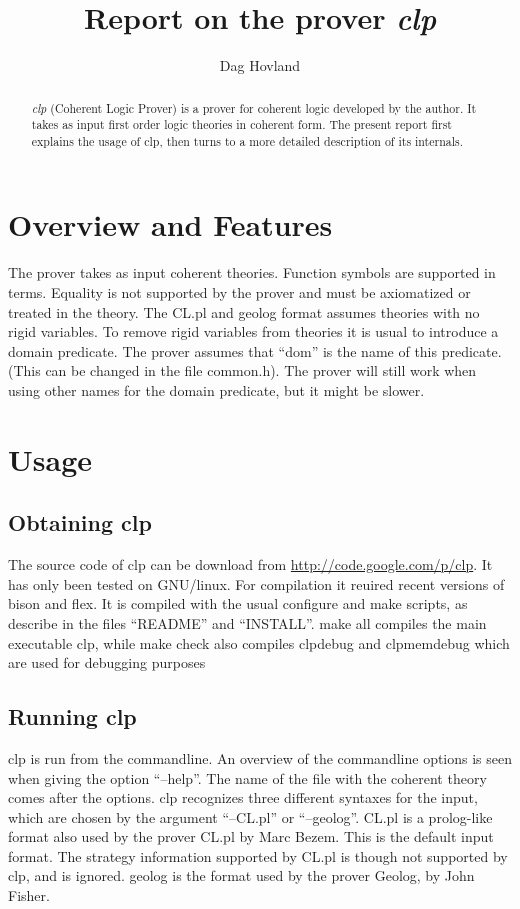 \documentclass[a4paper]{article}
\author{Dag Hovland}
\title{Report on the prover \emph{clp}}
\begin{document}
\maketitle
\begin{abstract}
  \emph{clp} (Coherent Logic Prover) is a prover for coherent logic developed by the author. It takes as input first order logic theories in coherent form. The present report first explains the usage of clp, then turns to a more detailed description of its internals.
\end{abstract}
\section{Overview and Features}
The prover takes as input coherent theories. Function symbols are supported in terms. Equality is not supported by the prover and must be axiomatized or treated in the theory. The CL.pl and geolog format assumes theories with no rigid variables. To remove rigid variables from theories it is usual to introduce a domain predicate. The prover assumes that ``dom'' is the name of this predicate. (This can be changed in the file common.h). The prover will still work when using other names for the domain predicate, but it might be slower. 
\section{Usage}
\subsection{Obtaining clp}
The source code of clp can be download from \url{http://code.google.com/p/clp}. It has only been tested on GNU/linux. For compilation it reuired recent versions of bison and flex. It is compiled with the usual configure and make scripts, as describe in the files ``README'' and ``INSTALL''. make all compiles the main executable clp, while make check also compiles clpdebug and clpmemdebug which are used for debugging purposes
\subsection{Running clp}
clp is run from the commandline. An overview of the commandline options is seen when giving the option ``--help''. The name of the file with the coherent theory comes after the options. clp recognizes three different syntaxes for the input, which are chosen by the argument ``--CL.pl'' or ``--geolog''. CL.pl is a prolog-like format also used by the prover CL.pl by Marc Bezem. This is the default input format. The strategy information supported by CL.pl is though not supported by clp, and is ignored. geolog is the format used by the prover Geolog, by John Fisher.
\end{document}
